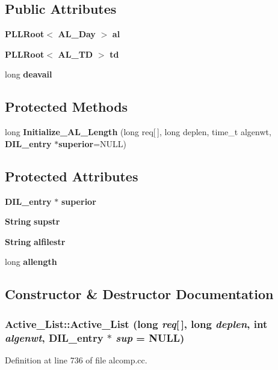 \subsection*{Public Attributes}
\begin{CompactItemize}
\item 
{\bf PLLRoot}$<$ {\bf AL\_\-Day} $>$ {\bf al}
\item 
{\bf PLLRoot}$<$ {\bf AL\_\-TD} $>$ {\bf td}
\item 
long {\bf deavail}
\end{CompactItemize}
\subsection*{Protected Methods}
\begin{CompactItemize}
\item 
long {\bf Initialize\_\-AL\_\-Length} (long req[$\,$], long deplen, time\_\-t algenwt, {\bf DIL\_\-entry} $\ast${\bf superior}=NULL)
\end{CompactItemize}
\subsection*{Protected Attributes}
\begin{CompactItemize}
\item 
{\bf DIL\_\-entry} $\ast$ {\bf superior}
\item 
{\bf String} {\bf supstr}
\item 
{\bf String} {\bf alfilestr}
\item 
long {\bf allength}
\end{CompactItemize}


\subsection{Constructor \& Destructor Documentation}
\subsubsection{\setlength{\rightskip}{0pt plus 5cm}Active\_\-List::Active\_\-List (long {\em req}[$\,$], long {\em deplen}, int {\em algenwt}, {\bf DIL\_\-entry} $\ast$ {\em sup} = NULL)}\label{classActive__List_a0}




Definition at line 736 of file alcomp.cc.

